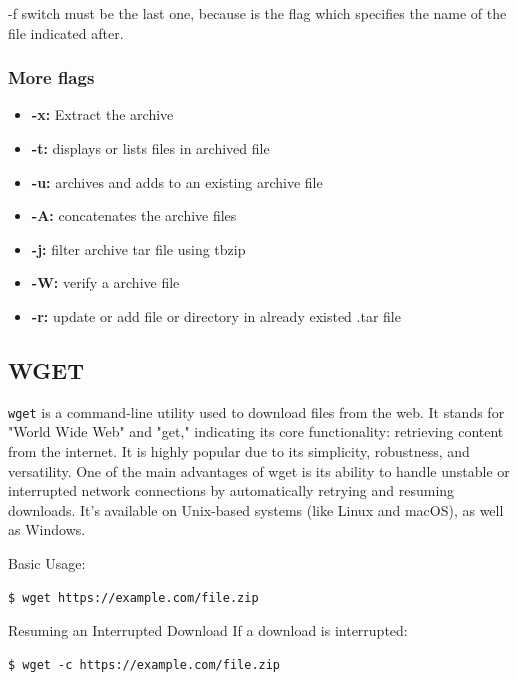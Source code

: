 \documentclass{article}
\newenvironment{blocktemplateIII}[1]{%
    \tcolorbox[beamer,%
    noparskip,breakable,
    ,colframe=Red,%
    colbacklower=LimeGreen!75!LightGreen,%
    title=#1]}%
    {\endtcolorbox}
\newenvironment{codetemplate}[1][]{%
  \mybasecolorbox[#1]
  \itshape
}{%
  \endmybasecolorbox
}
\begin{document}
\begin{blocktemplateIII}{Nota}
-f switch must be the last one, because is the flag which specifies the name of the file indicated after.
\end{blocktemplateIII}

\subsubsection{More flags}
\begin{itemize}
    \item \textbf{-x:} Extract the archive 
    \item \textbf{-t:} displays or lists files in archived file 
    \item \textbf{-u:} archives and adds to an existing archive file 
    \item \textbf{-A:} concatenates the archive files 
    \item \textbf{-j:} filter archive tar file using tbzip
    \item \textbf{-W:} verify a archive file
    \item \textbf{-r:} update or add file or directory in already existed .tar file
\end{itemize}

\subsection{WGET}
\verb|wget| is a command-line utility used to download files from the web. It stands for "World Wide Web" and "get," indicating its core functionality: retrieving content from the internet. It is highly popular due to its simplicity, robustness, and versatility. One of the main advantages of wget is its ability to handle unstable or interrupted network connections by automatically retrying and resuming downloads. It's available on Unix-based systems (like Linux and macOS), as well as Windows.

Basic Usage:
\begin{codetemplate}{}
\begin{verbatim}
$ wget https://example.com/file.zip
\end{verbatim}
\end{codetemplate}

Resuming an Interrupted Download If a download is interrupted:
\begin{codetemplate}{}
\begin{verbatim}
$ wget -c https://example.com/file.zip
\end{verbatim}
\end{codetemplate}
\end{document}
